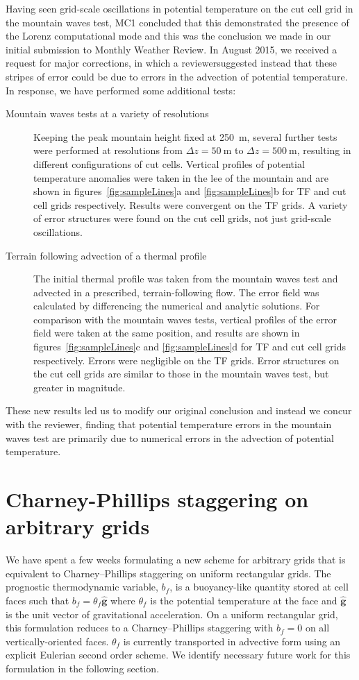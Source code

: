 \documentclass[a4paper]{article}
\begin{document}
Having seen grid-scale oscillations in potential temperature on the cut cell grid in the mountain waves test, MC1 concluded that this demonstrated the presence of the Lorenz computational mode and this was the conclusion we made in our initial submission to Monthly Weather Review.  In August 2015, we received a request for major corrections, in which a reviewersuggested instead that these stripes of error could be due to errors in the advection of potential temperature.
In response, we have performed some additional tests:
\begin{description}
	\item[Mountain waves tests at a variety of resolutions]{Keeping the peak mountain height fixed at \SI{250}{\meter}, several further tests were performed at resolutions from $\Delta z = \SI{50}{\meter}$ to $\Delta z = \SI{500}{\meter}$, resulting in different configurations of cut cells.  Vertical profiles of potential temperature anomalies were taken in the lee of the mountain and are shown in figures~\ref{fig:sampleLines}a and \ref{fig:sampleLines}b for TF and cut cell grids respectively.  Results were convergent on the TF grids.  A variety of error structures were found on the cut cell grids, not just grid-scale oscillations.}
	\item[Terrain following advection of a thermal profile]{The initial thermal profile was taken from the mountain waves test and advected in a prescribed, terrain-following flow.  The error field was calculated by differencing the numerical and analytic solutions.  For comparison with the mountain waves tests, vertical profiles of the error field were taken at the same position, and results are shown in figures~\ref{fig:sampleLines}c and \ref{fig:sampleLines}d for TF and cut cell grids respectively.  Errors were negligible on the TF grids.  Error structures on the cut cell grids are similar to those in the mountain waves test, but greater in magnitude.}
\end{description}
These new results led us to modify our original conclusion and instead we concur with the reviewer, finding that potential temperature errors in the mountain waves test are primarily due to numerical errors in the advection of potential temperature.

\section{Charney-Phillips staggering on arbitrary grids}
\label{sec:cp}
  We have spent a few weeks formulating a new scheme for arbitrary grids that is equivalent to Charney--Phillips staggering on uniform rectangular grids.  The prognostic thermodynamic variable, $b_f$, is a buoyancy-like quantity stored at cell faces such that $b_f = \theta_f \bm{\hat{g}}$ where $\theta_f$ is the potential temperature at the face and $\bm{\hat{g}}$ is the unit vector of gravitational acceleration.  On a uniform rectangular grid, this formulation reduces to a Charney--Phillips staggering with $b_f = 0$ on all vertically-oriented faces.  $\theta_f$ is currently transported in advective form using an explicit Eulerian second order scheme.  We identify necessary future work for this formulation in the following section.
\end{document}
